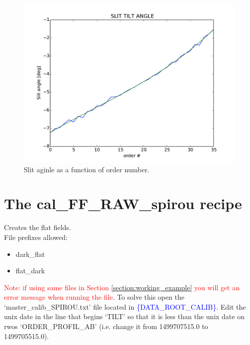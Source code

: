 \begin{figure}
\begin{center}
\includegraphics[width=.8\textwidth]{figures/cal_SLIT_spirou_2.pdf}
\caption{Slit aginle as a function of order number. \label{figure:cal_slit_spirou_2}}
\end{center}
\end{figure}

\clearpage
\newpage
\section{The cal\_FF\_RAW\_spirou recipe}
\label{section:cal_FF_RAW_spirou}

Creates the flat fields. \\ 


\noindent File prefixes allowed:
\begin{itemize}
	\item dark\_flat
	\item flat\_dark
\end{itemize}

\noindent \textcolor{red}{Note: if using same files in Section \ref{section:working_example} you will get an error message when running the file}.
\noindent To solve this open the `master\_calib\_SPIROU.txt' file located in \textcolor{blue}{\{DATA\_ROOT\_CALIB\}}. Edit the unix date in the line that begins `TILT' so that it is less than the unix date on rwos `ORDER\_PROFIL\_AB' (i.e. change it from 1499707515.0 to 1499705515.0).

